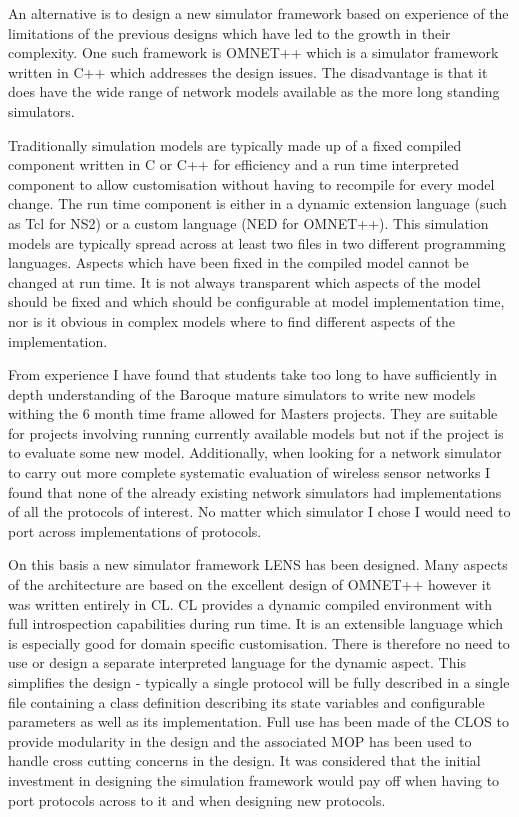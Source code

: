 \documentclass[a4paper,11pt,twoside,openany]{report}
\newcommand{\acr}[1]{\acrshort{#1}}
\begin{document}
An alternative is to design a new simulator framework based
on experience of the limitations of the previous designs which have
led to the growth in their complexity. One such framework is OMNET++
which is a simulator framework written in C++ which addresses the design
issues. The disadvantage is that it does have the wide range of network
models available as the more long standing simulators.

Traditionally simulation models are typically made up of a fixed
compiled component written in C or C++ for efficiency and a run time
interpreted component to allow customisation without having to
recompile for every model change. The run time component is either in
a dynamic extension language (such as Tcl for NS2) or a custom
language (NED for OMNET++). This simulation models are typically
spread across at least two files in two different programming
languages.  Aspects which have been fixed in the compiled model cannot
be changed at run time. It is not always transparent which aspects of
the model should be fixed and which should be configurable at model
implementation time, nor is it obvious in complex models where to find
different aspects of the implementation.

From experience I have found that students take too long to have
sufficiently in depth understanding of the Baroque mature simulators
to write new models withing the 6 month time frame allowed for Masters
projects. They are suitable for projects involving running currently
available models but not if the project is to evaluate some new model.
Additionally, when looking for a network simulator to carry out more
complete systematic evaluation of wireless sensor networks I found
that none of the already existing network simulators had
implementations of all the protocols of interest. No matter which
simulator I chose I would need to port across implementations of
protocols.

On this basis a new simulator framework \acr{LENS} has been
designed. Many aspects of the architecture are based on the excellent
design of OMNET++ however it was written entirely in
\gls{CL}. \gls{CL} provides a dynamic compiled environment with full
introspection capabilities during run time. It is an extensible
language which is especially good for domain specific customisation.
There is therefore no need to use or design a separate interpreted
language for the dynamic aspect. This simplifies the design -
typically a single protocol will be fully described in a single file
containing a class definition describing its state variables and
configurable parameters as well as its implementation.  Full use has
been made of the \gls{CLOS} to provide modularity in the design and
the associated \gls{MOP} has been used to handle cross cutting
concerns in the design.  It was considered that the initial investment
in designing the simulation framework would pay off when having to
port protocols across to it and when designing new protocols.
\end{document}
